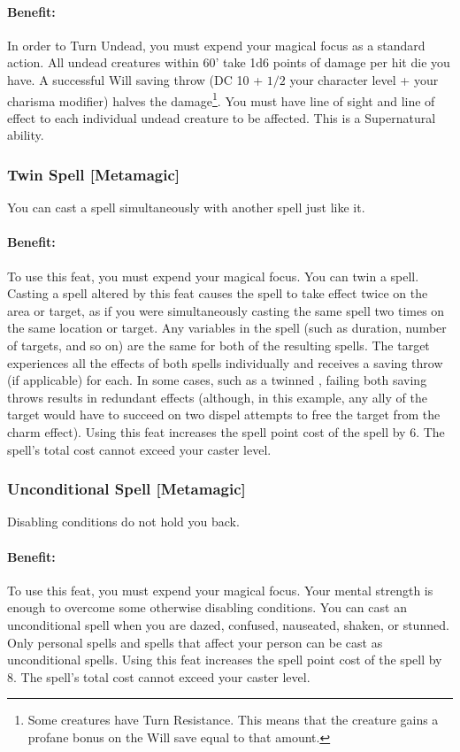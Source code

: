 \paragraph{Benefit:} In order to Turn Undead, you must expend your magical focus as a standard action.
All undead creatures within 60' take 1d6 points of damage per hit die you have. 
A successful Will saving throw (DC 10 + $1/2$ your character level + your charisma modifier) halves the damage\footnote{
Some creatures have Turn Resistance. This means that the creature gains a profane bonus on the Will save equal to that amount.}.
You must have line of sight and line of effect to each individual undead creature to be affected. This is a Supernatural ability.
\subsubsection[Twin Spell]{Twin Spell [Metamagic]}
\label{Feat:TwinSpell}
You can cast a spell simultaneously with another spell just like it.

\paragraph{Benefit:} To use this feat, you must expend your magical focus. 
You can twin a spell. Casting a spell altered by this feat causes the spell to take effect twice on the area or target, 
as if you were simultaneously casting the same spell two times on the same location or target. 
Any variables in the spell (such as duration, number of targets, and so on) are the same for both of the resulting spells. 
The target experiences all the effects of both spells individually and receives a saving throw (if applicable) for each. 
In some cases, such as a twinned , failing both saving throws results in redundant effects 
(although, in this example, any ally of the target would have to succeed on two dispel attempts to free the target from the charm effect).
Using this feat increases the spell point cost of the spell by 6. The spell's total cost cannot exceed your caster level.

\subsubsection[Unconditional Spell]{Unconditional Spell [Metamagic]}
\label{Feat:UnconditionalSpell}
Disabling conditions do not hold you back.

\paragraph{Benefit:} To use this feat, you must expend your magical focus. Your mental strength is enough to overcome some otherwise disabling conditions. You can cast an unconditional spell when you are dazed, confused, nauseated, shaken, or stunned.
Only personal spells and spells that affect your person can be cast as unconditional spells.
Using this feat increases the spell point cost of the spell by 8. The spell's total cost cannot exceed your caster level.